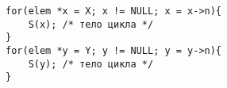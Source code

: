 \begin{lstlisting}[caption={Итератор объединения дизъюнктивных множеств}, label=p_47_iter_un_sets, escapechar=\%]
for(elem *x = X; x != NULL; x = x->n){
	S(x); /* тело цикла */
}
for(elem *y = Y; y != NULL; y = y->n){
	S(y); /* тело цикла */
}
\end{lstlisting}
